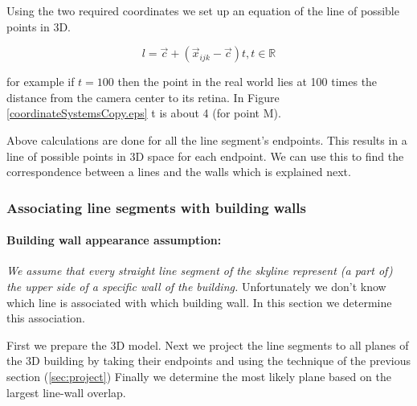 

	Using the two required coordinates we set up an equation of the
	line of possible points in 3D.  

	 \[ l = \vec{c} + (\vec{x}_{ijk}-\vec{c})t, t \in \mathbb{R} \]

	for example if $t=100$ then the point in the real world lies at 100 times
		the distance from the camera center to its retina.
	In Figure \ref{coordinateSystemsCopy.eps} t is about 4 (for point M).

	Above calculations are done for all the line segment's endpoints.
	This results in a line of possible points in 3D space for each endpoint.
	We can use this to find the correspondence between a lines and the walls
	which is explained next.


\subsubsection{Associating line segments with building walls}
\label{sec:linewallass}
	\paragraph{Building wall appearance assumption:}
	\emph{We assume that every straight line segment of the skyline represent (a part of) the upper side of a specific wall of the building.}
	Unfortunately we don't know which line is associated with which building
	wall. In this section we determine this association.

	First we prepare the 3D model. Next we project the line segments to all planes of the 3D building by
	taking their endpoints and using the technique of the previous section (\ref{sec:project})
	Finally we determine the most likely plane based on the largest line-wall overlap. 

